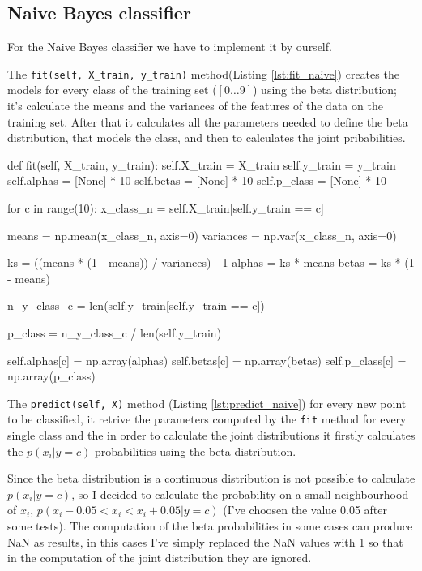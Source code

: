 \documentclass[12pt]{article}
\begin{document}
\subsection{Naive Bayes classifier}

For the Naive Bayes classifier we have to implement it by ourself.

The \verb|fit(self, X_train, y_train)| method(Listing \ref{lst:fit_naive}) creates 
the models for every class of the
training set ($[0 \dots 9]$) using the beta distribution; it's calculate the means
and the variances of the features of the data on the training set. After that it
calculates all the parameters needed to define the beta distribution, that models the 
class, and then to calculates the joint pribabilities.

\begin{python}[caption={Naive Bayes fit method},label={lst:fit_naive}]
def fit(self, X_train, y_train):
    self.X_train = X_train
    self.y_train = y_train
    self.alphas = [None] * 10
    self.betas = [None] * 10
    self.p_class = [None] * 10

    for c in range(10):
        x_class_n = self.X_train[self.y_train == c]

        means = np.mean(x_class_n, axis=0)
        variances = np.var(x_class_n, axis=0)            
        
        ks = ((means * (1 - means)) / variances) - 1
        alphas = ks * means
        betas = ks * (1 - means)

        n_y_class_c = len(self.y_train[self.y_train == c])

        p_class = n_y_class_c / len(self.y_train)

        self.alphas[c] = np.array(alphas)
        self.betas[c] = np.array(betas)
        self.p_class[c] = np.array(p_class)
\end{python}

The \verb|predict(self, X)| method (Listing \ref{lst:predict_naive}) for every new 
point to be classified, it retrive
the parameters computed by the \verb|fit| method for every single class and the in 
order to calculate the joint distributions it firstly calculates the $p(x_i|y=c)$ 
probabilities using the beta distribution. 

Since the beta distribution is a continuous
distribution is not possible to calculate $p(x_i|y=c)$, so I decided to calculate
the probability on a small neighbourhood of $x_i$, $p( x_i-0.05<x_i<x_i+0.05 | y=c)$ 
(I've choosen the value 0.05 after some tests). 
The computation of the beta probabilities in some cases can produce NaN as results, 
in this cases I've simply replaced the NaN values with 1 so that in the computation
of the joint distribution they are ignored.
\end{document}
